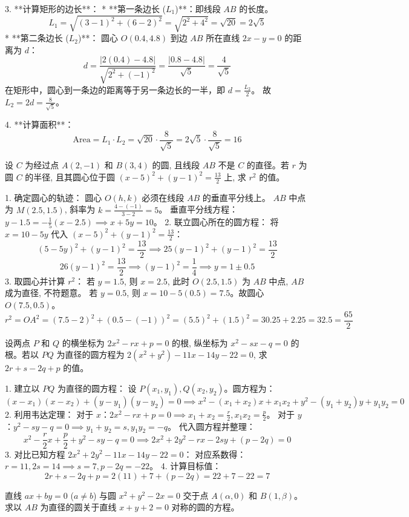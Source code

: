 \begin{questions}
\begin{solution}
3. **计算矩形的边长**：
   * **第一条边长 ($L_1$)**：即线段 $AB$ 的长度。
       \[ L_1 = \sqrt{(3 - 1)^2 + (6 - 2)^2} = \sqrt{2^2 + 4^2} = \sqrt{20} = 2\sqrt{5} \]
   * **第二条边长 ($L_2$)**：
       圆心 $O(0.4, 4.8)$ 到边 $AB$ 所在直线 $2x - y = 0$ 的距离为 $d$：
       \[ d = \frac{|2(0.4) - 4.8|}{\sqrt{2^2 + (-1)^2}} = \frac{|0.8 - 4.8|}{\sqrt{5}} = \frac{4}{\sqrt{5}} \]
       在矩形中，圆心到一条边的距离等于另一条边长的一半，即 $d = \frac{L_2}{2}$。
       故 $L_2 = 2d = \frac{8}{\sqrt{5}}$。

4. **计算面积**：
   \[ \text{Area} = L_1 \cdot L_2 = \sqrt{20} \cdot \frac{8}{\sqrt{5}} = 2\sqrt{5} \cdot \frac{8}{\sqrt{5}} = 16 \]
\end{solution}
\question
设 $C$ 为经过点 $A(2, -1)$ 和 $B(3, 4)$ 的圆, 且线段 $AB$ 不是 $C$ 的直径。若 $r$ 为圆 $C$ 的半径, 且其圆心位于圆 $(x - 5)^2 + (y - 1)^2 = \frac{13}{2}$ 上, 求 $r^2$ 的值。

\begin{solution}
1. 确定圆心的轨迹：
圆心 $O(h, k)$ 必须在线段 $AB$ 的垂直平分线上。
$AB$ 中点为 $M(2.5, 1.5)$, 斜率为 $k = \frac{4 - (-1)}{3 - 2} = 5$。
垂直平分线方程：$y - 1.5 = -\frac{1}{5}(x - 2.5) \implies x + 5y = 10$。
2. 联立圆心所在的圆方程：
将 $x = 10 - 5y$ 代入 $(x - 5)^2 + (y - 1)^2 = \frac{13}{2}$：
\[
(5 - 5y)^2 + (y - 1)^2 = \frac{13}{2} \implies 25(y - 1)^2 + (y - 1)^2 = \frac{13}{2}
\]
\[
26(y - 1)^2 = \frac{13}{2} \implies (y - 1)^2 = \frac{1}{4} \implies y = 1 \pm 0.5
\]
3. 取圆心并计算 $r^2$：
若 $y = 1.5$, 则 $x = 2.5$, 此时 $O(2.5, 1.5)$ 为 $AB$ 中点, $AB$ 成为直径, 不符题意。
若 $y = 0.5$, 则 $x = 10 - 5(0.5) = 7.5$。故圆心 $O(7.5, 0.5)$。
\[
r^2 = OA^2 = (7.5 - 2)^2 + (0.5 - (-1))^2 = (5.5)^2 + (1.5)^2 = 30.25 + 2.25 = 32.5 = \frac{65}{2}
\]
\end{solution}

\question
设两点 $P$ 和 $Q$ 的横坐标为 $2x^2 - rx + p = 0$ 的根, 纵坐标为 $x^2 - sx - q = 0$ 的根。若以 $PQ$ 为直径的圆方程为 $2(x^2 + y^2) - 11x - 14y - 22 = 0$, 求 $2r + s - 2q + p$ 的值。

\begin{solution}
1. 建立以 $PQ$ 为直径的圆方程：
设 $P(x_1, y_1), Q(x_2, y_2)$。圆方程为：
\[
(x - x_1)(x - x_2) + (y - y_1)(y - y_2) = 0 \implies x^2 - (x_1 + x_2)x + x_1x_2 + y^2 - (y_1 + y_2)y + y_1y_2 = 0
\]
2. 利用韦达定理：
对于 $x$：$2x^2 - rx + p = 0 \implies x_1 + x_2 = \frac{r}{2}, x_1x_2 = \frac{p}{2}$。
对于 $y$：$y^2 - sy - q = 0 \implies y_1 + y_2 = s, y_1y_2 = -q$。
代入圆方程并整理：
\[
x^2 - \frac{r}{2}x + \frac{p}{2} + y^2 - sy - q = 0 \implies 2x^2 + 2y^2 - rx - 2sy + (p - 2q) = 0
\]
3. 对比已知方程 $2x^2 + 2y^2 - 11x - 14y - 22 = 0$：
对应系数得：$r = 11, 2s = 14 \implies s = 7, p - 2q = -22$。
4. 计算目标值：
\[
2r + s - 2q + p = 2(11) + 7 + (p - 2q) = 22 + 7 - 22 = 7
\]
\end{solution}
\question
直线 $ax + by = 0$ ($a \neq b$) 与圆 $x^2 + y^2 - 2x = 0$ 交于点 $A(\alpha, 0)$ 和 $B(1, \beta)$。求以 $AB$ 为直径的圆关于直线 $x + y + 2 = 0$ 对称的圆的方程。


\end{questions}
